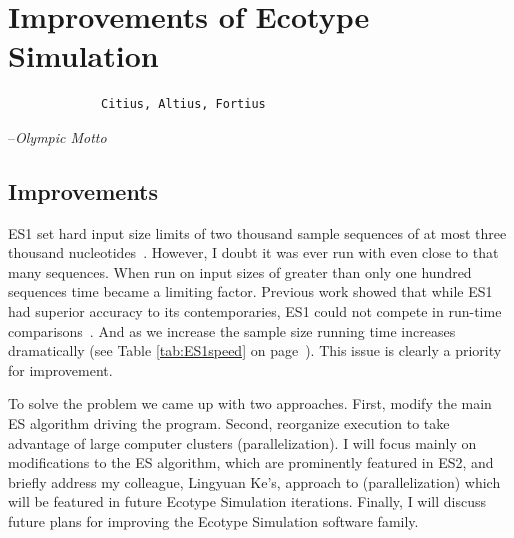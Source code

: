 \gobbletocpage
\chapter{Improvements of Ecotype Simulation}
\restoretocpage

\begin{shadequote}
\begin{center}
    \Large\begin{verbatim} 
             Citius, Altius, Fortius
 \end{verbatim}  
\end{center}
\par--\emph{Olympic Motto}
\end{shadequote}


\section{Improvements}
ES1 set hard input size limits of two thousand sample sequences of at most three thousand nucleotides~\cite{koeppel2008identifying}.
However, I doubt it was ever run with even close to that many sequences.
When run on input sizes of greater than only one hundred sequences time became a limiting factor.
Previous work showed that while ES1 had superior  accuracy to its contemporaries, ES1 could not compete in run-time comparisons~\cite{carlo}.
And as we increase the sample size running time increases dramatically (see Table \ref{tab:ES1speed} on page~\pageref{tab:ES1speed}).
This issue is clearly a priority for improvement.

To solve the problem we came up with two approaches.
First, modify the main ES algorithm driving the program.
Second, reorganize execution to take advantage of large computer clusters (parallelization).
I will focus mainly on modifications to the ES algorithm, which are prominently featured in ES2, and briefly address my colleague, Lingyuan Ke's, approach to (parallelization) which will be featured in future Ecotype Simulation iterations.
Finally, I will discuss future plans for improving the Ecotype Simulation software family.


